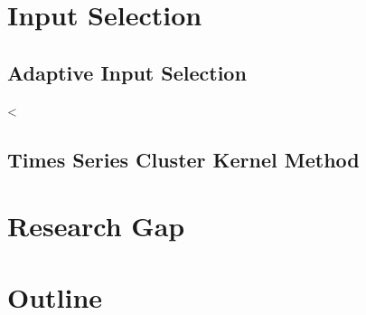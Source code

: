 \section{Input Selection}
\label{sec:feature_selectiom}



\subsection{Adaptive Input Selection}
\label{sec:Adaptiveinputselection}

<%
\subsection{Times Series Cluster Kernel Method}
\label{sec:introTCK}



\section{Research Gap}
\label{sec:researchgap}

\section{Outline} %
\label{sec:outline}

